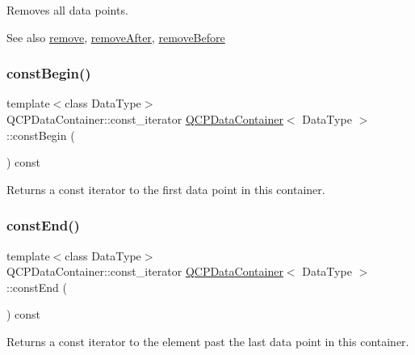 Removes all data points.

\begin{DoxySeeAlso}{See also}
\hyperlink{classQCPDataContainer_ae5f569a120648b167efa78835f12fd38}{remove}, \hyperlink{classQCPDataContainer_abbe5d87ffc10b5aeffa5bb42cf03aa3c}{remove\+After}, \hyperlink{classQCPDataContainer_aa7f74cbce304b0369e1626c3798e1eda}{remove\+Before} 
\end{DoxySeeAlso}
\mbox{\label{classQCPDataContainer_a49d7622999e2de67fa2331626a3159aa}} 
\subsubsection{\texorpdfstring{const\+Begin()}{constBegin()}}
{\footnotesize\ttfamily template$<$class Data\+Type$>$ \\
Q\+C\+P\+Data\+Container\+::const\+\_\+iterator \hyperlink{classQCPDataContainer}{Q\+C\+P\+Data\+Container}$<$ Data\+Type $>$\+::const\+Begin (\begin{DoxyParamCaption}{ }\end{DoxyParamCaption}) const\hspace{0.3cm}{\ttfamily [inline]}}

Returns a const iterator to the first data point in this container. \mbox{\label{classQCPDataContainer_aa7f7cf239b85b1a28de3d675cc5b3da1}} 
\subsubsection{\texorpdfstring{const\+End()}{constEnd()}}
{\footnotesize\ttfamily template$<$class Data\+Type$>$ \\
Q\+C\+P\+Data\+Container\+::const\+\_\+iterator \hyperlink{classQCPDataContainer}{Q\+C\+P\+Data\+Container}$<$ Data\+Type $>$\+::const\+End (\begin{DoxyParamCaption}{ }\end{DoxyParamCaption}) const\hspace{0.3cm}{\ttfamily [inline]}}

Returns a const iterator to the element past the last data point in this container. \mbox{\label{classQCPDataContainer_aece90eeb2ba8d3c46d3d94023630fbc7}} 
